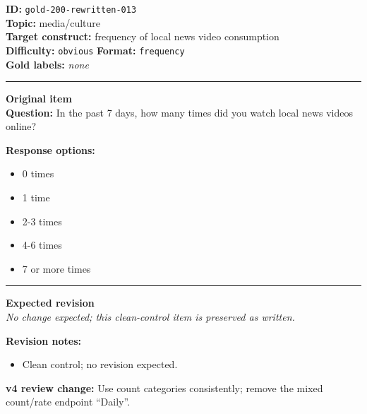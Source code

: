 \documentclass[10pt,a4paper]{article}
\newcommand{\sectionline}{\vspace{0.15em}\hrule\vspace{0.35em}}
\begin{document}
\begin{tcolorbox}[colframe=CleanGreen,colback=white,colbacktitle=CleanGreen!9,coltitle=black,title={Item 013\hfill Clean control}]
\textbf{ID:} \texttt{gold-200-rewritten-013}\\
\textbf{Topic:} media/culture\\
\textbf{Target construct:} frequency of local news video consumption\\
\textbf{Difficulty:} \texttt{obvious} \quad \textbf{Format:} \texttt{frequency}\\
\textbf{Gold labels:} \textit{none}\\
\sectionline
\textbf{Original item}\\
\textbf{Question:} In the past 7 days, how many times did you watch local news videos online?
\par\textbf{Response options:}
\begin{itemize}
\item 0 times
\item 1 time
\item 2-3 times
\item 4-6 times
\item 7 or more times
\end{itemize}
\sectionline
\textbf{Expected revision}\\
\textit{No change expected; this clean-control item is preserved as written.}
\par\textbf{Revision notes:}
\begin{itemize}
\item Clean control; no revision expected.
\end{itemize}
\par\textbf{v4 review change:} Use count categories consistently; remove the mixed count/rate endpoint ``Daily''.
\end{tcolorbox}
\end{document}

